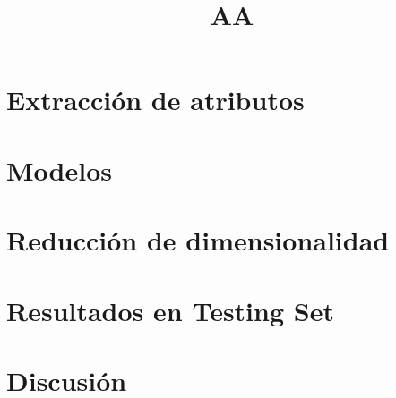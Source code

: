 \documentclass[hidelinks,a4paper,12pt, nofootinbib]{article}
\title{AA}
\begin{document}
\maketitle

\tableofcontents
\newpage

\section{Extracción de atributos}

\newpage

\section{Modelos}

\newpage

\section{Reducción de dimensionalidad}

\newpage

\section{Resultados en Testing Set}

\newpage

\section{Discusión}

\newpage
\end{document}

